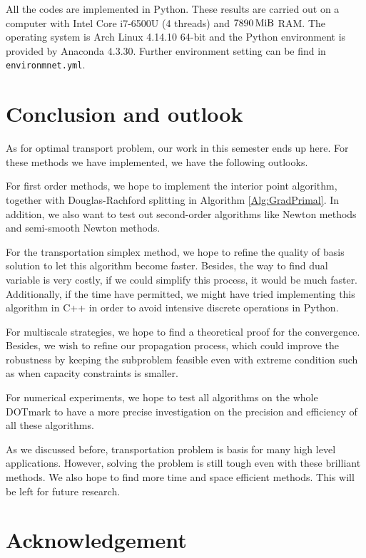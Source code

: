 \documentclass[english]{pkupaper}
\begin{document}
All the codes are implemented in Python. These results are carried out on a computer with Intel Core i7-6500U (4 threads) and $\SI{7890}{\mebi\byte}$ RAM. The operating system is Arch Linux 4.14.10 64-bit and the Python environment is provided by Anaconda 4.3.30. Further environment setting can be find in \verb"environmnet.yml".

\section{Conclusion and outlook}

As for optimal transport problem, our work in this semester ends up here. For these methods we have implemented, we have the following outlooks. 

For first order methods, we hope to implement the interior point algorithm, together with Douglas-Rachford splitting in Algorithm \ref{Alg:GradPrimal}. In addition, we also want to test out second-order algorithms like Newton methods and semi-smooth Newton methods. 

For the transportation simplex method, we hope to refine the quality of basis solution to let this algorithm become faster. Besides, the way to find dual variable is very costly, if we could simplify this process, it would be much faster. Additionally, if the time have permitted, we might have tried implementing this algorithm in C++ in order to avoid intensive discrete operations in Python. 

For multiscale strategies, we hope to find a theoretical proof for the convergence. Besides, we wish to refine our propagation process, which could improve the robustness by keeping the subproblem feasible even with extreme condition such as when capacity constraints is smaller.

For numerical experiments, we hope to test all algorithms on the whole DOTmark to have a more precise investigation on the precision and efficiency of all these algorithms.

As we discussed before, transportation problem is basis for many high level applications. However, solving the problem is still tough even with these brilliant methods. We also hope to find more time and space efficient methods. This will be left for future research.

\section{Acknowledgement}
\end{document}
